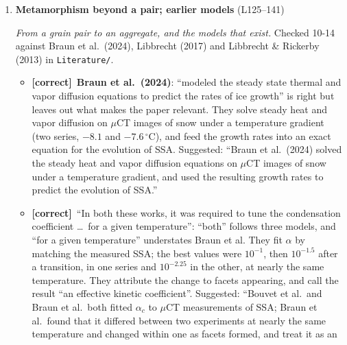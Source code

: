 \documentclass[11pt]{article}
\newcommand{\Pg}[3]{\item \textbf{#1} {\small(#2)}\par\textit{#3}}
\newcommand{\tC}{\textcolor{miss}{\textbf{[correct]}}\ }
\newcommand{\tG}{\textcolor{stale}{\textbf{[wording]}}\ }
\newcommand{\tA}{\textcolor{have}{\textbf{[add]}}\ }
\begin{document}
\begin{enumerate}
\begin{itemize}
  \item \tG ``Ice growth from vapor transport will occur in response to its
    environmental conditions, governed by'': ``The growth rate of ice from
    vapor depends on''. ``super saturation'': one word. Two spaces and a
    stray space around $v_{\mathrm{kin}}$ and $\sigma_{\mathrm{surf}}$ in the
    source.
  \item \tA (optional) Which limit applies depends on $\alpha_c$ and grain
    size: with $\alpha_c = 10^{-3}$ and 50~$\mu$m grains, attachment and
    diffusion resistances are comparable ($\Lambda \approx 2.8$, scaling
    note). Better placed in Section~2.2 or 5.2; mention here only if it
    helps paragraph~8.
  \end{itemize}
\Pg{Metamorphism beyond a pair; earlier models}{L125--141}{From a grain pair to an aggregate, and the models that exist.}
  Checked 10-14 against Braun et al.\ (2024), Libbrecht (2017) and
  Libbrecht \& Rickerby (2013) in \texttt{Literature/}.
  \begin{itemize}
  \item \tC \textbf{Braun et al.\ (2024)}: ``modeled the steady state
    thermal and vapor diffusion equations to predict the rates of ice
    growth'' is right but leaves out what makes the paper relevant. They
    solve steady heat and vapor diffusion on $\mu$CT images of snow under a
    temperature gradient (two series, $-8.1$ and $-7.6\,^{\circ}$C), and
    feed the growth rates into an exact equation for the evolution of SSA.
    Suggested: ``Braun et al.\ (2024) solved the steady heat and vapor
    diffusion equations on $\mu$CT images of snow under a temperature
    gradient, and used the resulting growth rates to predict the evolution
    of SSA.''
  \item \tC ``In both these works, it was required to tune the condensation
    coefficient \ldots\ for a given temperature'': ``both'' follows three
    models, and ``for a given temperature'' understates Braun et al. They
    fit $\alpha$ by matching the measured SSA; the best values were
    $10^{-1}$, then $10^{-1.5}$ after a transition, in one series and
    $10^{-2.25}$ in the other, at nearly the same temperature. They
    attribute the change to facets appearing, and call the result ``an
    effective kinetic coefficient''. Suggested: ``Bouvet et al.\ and Braun
    et al.\ both fitted $\alpha_c$ to $\mu$CT measurements of SSA; Braun et
    al.\ found that it differed between two experiments at nearly the same
    temperature and changed within one as facets formed, and treat it as an

\end{itemize}
\end{enumerate}
\end{document}
